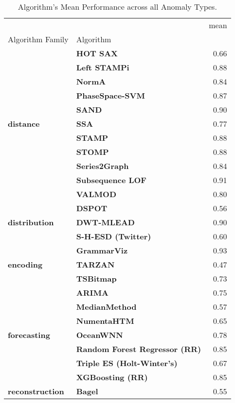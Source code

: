 \begin{table}[h]
\centering
\caption{Algorithm's Mean Performance across all Anomaly Types.}
\label{tab:performance_across_anomaly_kinds}
\begin{tabular}{llr}
\toprule
 &  & mean \\
Algorithm Family & Algorithm &  \\
\midrule
\multirow[t]{11}{*}{\textbf{distance}} & \textbf{HOT SAX} & 0.66 \\
\textbf{} & \textbf{Left STAMPi} & 0.88 \\
\textbf{} & \textbf{NormA} & 0.84 \\
\textbf{} & \textbf{PhaseSpace-SVM} & 0.87 \\
\textbf{} & \textbf{SAND} & 0.90 \\
\textbf{} & \textbf{SSA} & 0.77 \\
\textbf{} & \textbf{STAMP} & 0.88 \\
\textbf{} & \textbf{STOMP} & 0.88 \\
\textbf{} & \textbf{Series2Graph} & 0.84 \\
\textbf{} & \textbf{Subsequence LOF} & 0.91 \\
\textbf{} & \textbf{VALMOD} & 0.80 \\
\cline{1-3}
\multirow[t]{3}{*}{\textbf{distribution}} & \textbf{DSPOT} & 0.56 \\
\textbf{} & \textbf{DWT-MLEAD} & 0.90 \\
\textbf{} & \textbf{S-H-ESD (Twitter)} & 0.60 \\
\cline{1-3}
\multirow[t]{3}{*}{\textbf{encoding}} & \textbf{GrammarViz} & 0.93 \\
\textbf{} & \textbf{TARZAN} & 0.47 \\
\textbf{} & \textbf{TSBitmap} & 0.73 \\
\cline{1-3}
\multirow[t]{7}{*}{\textbf{forecasting}} & \textbf{ARIMA} & 0.75 \\
\textbf{} & \textbf{MedianMethod} & 0.57 \\
\textbf{} & \textbf{NumentaHTM} & 0.65 \\
\textbf{} & \textbf{OceanWNN} & 0.78 \\
\textbf{} & \textbf{Random Forest Regressor (RR)} & 0.85 \\
\textbf{} & \textbf{Triple ES (Holt-Winter's)} & 0.67 \\
\textbf{} & \textbf{XGBoosting (RR)} & 0.85 \\
\cline{1-3}
\multirow[t]{7}{*}{\textbf{reconstruction}} & \textbf{Bagel} & 0.55 \\

\end{tabular}
\end{table}
